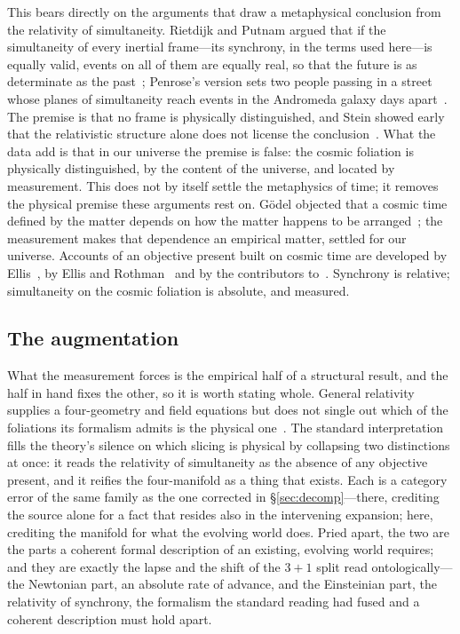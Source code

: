 \documentclass[11pt,a4paper]{article}
\begin{document}
This bears directly on the arguments that draw a metaphysical conclusion from the relativity of simultaneity. Rietdijk and Putnam argued that if the simultaneity of every inertial frame---its synchrony, in the terms used here---is equally valid, events on all of them are equally real, so that the future is as determinate as the past~\cite{Rietdijk1966, Putnam1967}; Penrose's version sets two people passing in a street whose planes of simultaneity reach events in the Andromeda galaxy days apart~\cite{Penrose1989}. The premise is that no frame is physically distinguished, and Stein showed early that the relativistic structure alone does not license the conclusion~\cite{Stein1968}. What the data add is that in our universe the premise is false: the cosmic foliation is physically distinguished, by the content of the universe, and located by measurement. This does not by itself settle the metaphysics of time; it removes the physical premise these arguments rest on. G\"odel objected that a cosmic time defined by the matter depends on how the matter happens to be arranged~\cite{Godel1949}; the measurement makes that dependence an empirical matter, settled for our universe. Accounts of an objective present built on cosmic time are developed by Ellis~\cite{Ellis2006}, by Ellis and Rothman~\cite{EllisRothman2010} and by the contributors to~\cite{CraigSmith2007}. Synchrony is relative; simultaneity on the cosmic foliation is absolute, and measured.

\subsection{The augmentation}\label{sec:augmentation}

What the measurement forces is the empirical half of a structural result, and the half in hand fixes the other, so it is worth stating whole. General relativity supplies a four-geometry and field equations but does not single out which of the foliations its formalism admits is the physical one~\cite{JanzenCRframework}. The standard interpretation fills the theory's silence on which slicing is physical by collapsing two distinctions at once: it reads the relativity of simultaneity as the absence of any objective present, and it reifies the four-manifold as a thing that exists. Each is a category error of the same family as the one corrected in \S\ref{sec:decomp}---there, crediting the source alone for a fact that resides also in the intervening expansion; here, crediting the manifold for what the evolving world does. Pried apart, the two are the parts a coherent formal description of an existing, evolving world requires; and they are exactly the lapse and the shift of the $3{+}1$ split read ontologically---the Newtonian part, an absolute rate of advance, and the Einsteinian part, the relativity of synchrony, the formalism the standard reading had fused and a coherent description must hold apart.
\end{document}
